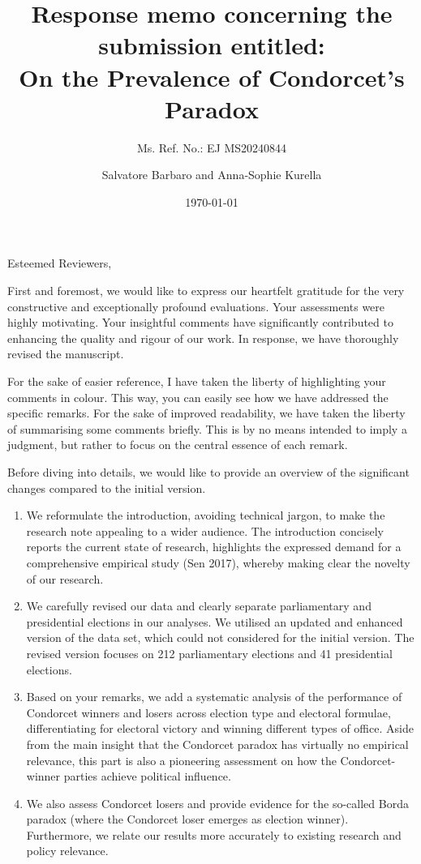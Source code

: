 \documentclass[a4paper, 12pt]{scrartcl}
\title{{\small Response memo concerning the submission entitled:} \\ On the Prevalence of Condorcet's Paradox }
\subtitle{Ms. Ref. No.: EJ MS20240844}
\author{Salvatore Barbaro and Anna-Sophie Kurella}
\date{\today}
\theoremstyle{break}
\begin{document}
\maketitle

\linenumbers

\noindent Esteemed Reviewers,


First and foremost, we would like to express our heartfelt gratitude for the very constructive and exceptionally profound evaluations. Your assessments were highly motivating. Your insightful comments have significantly contributed to enhancing the quality and rigour of our work. In response, we have thoroughly revised the manuscript.

For the sake of easier reference, I have taken the liberty of highlighting your comments in colour. This way, you can easily see how we have addressed the specific remarks. For the sake of improved readability, we have taken the liberty of summarising some comments briefly. This is by no means intended to imply a judgment, but rather to focus on the central essence of each remark.

Before diving into details, we would like to provide an overview of the significant changes compared to the initial version.
\begin{enumerate}
 \item We reformulate the introduction, avoiding technical jargon, to make the research note appealing to a wider audience. The introduction concisely reports the current state of research, highlights the expressed demand for a comprehensive empirical study (Sen 2017), whereby making clear the novelty of our research.
\item We carefully revised our data and clearly separate parliamentary and presidential elections in our analyses. We utilised an updated and enhanced version of the data set, which could not considered for the initial version. The revised version focuses on 212 parliamentary elections and 41 presidential elections. 
\item Based on your remarks, we add a systematic analysis of the performance of Condorcet winners and losers across election type and electoral formulae, differentiating for electoral victory and winning different types of office. Aside from the main insight that the Condorcet paradox has virtually no empirical relevance, this part is also a pioneering assessment on how the Condorcet-winner parties achieve political influence. 
\item We also assess Condorcet losers and provide evidence for the so-called Borda paradox (where the Condorcet loser emerges as election winner). Furthermore, we relate our results more accurately to existing research and policy relevance.
\end{enumerate}
\end{document}
